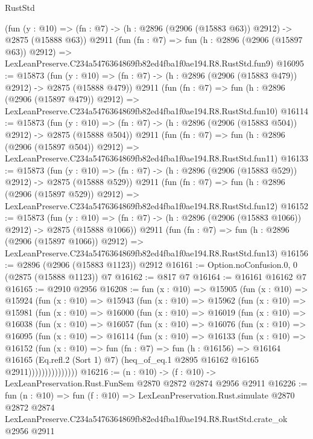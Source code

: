 \begin{lexlean}{RustStd}
\begin{coremodule}
    (fun (y : @10) => (fn : @7) -> (h : @2896 (@2906 (@15883 @63)) @2912) -> @2875 (@15888 @63))
    @2911
    (fun (fn : @7) =>
    fun (h : @2896 (@2906 (@15897 @63)) @2912) =>
    LexLeanPreserve.C234a5476364869fb82ed4fba1f0ae194.R8.RustStd.fun9)
@16095 := @15873
    (fun (y : @10) => (fn : @7) -> (h : @2896 (@2906 (@15883 @479)) @2912) -> @2875 (@15888 @479))
    @2911
    (fun (fn : @7) =>
    fun (h : @2896 (@2906 (@15897 @479)) @2912) =>
    LexLeanPreserve.C234a5476364869fb82ed4fba1f0ae194.R8.RustStd.fun10)
@16114 := @15873
    (fun (y : @10) => (fn : @7) -> (h : @2896 (@2906 (@15883 @504)) @2912) -> @2875 (@15888 @504))
    @2911
    (fun (fn : @7) =>
    fun (h : @2896 (@2906 (@15897 @504)) @2912) =>
    LexLeanPreserve.C234a5476364869fb82ed4fba1f0ae194.R8.RustStd.fun11)
@16133 := @15873
    (fun (y : @10) => (fn : @7) -> (h : @2896 (@2906 (@15883 @529)) @2912) -> @2875 (@15888 @529))
    @2911
    (fun (fn : @7) =>
    fun (h : @2896 (@2906 (@15897 @529)) @2912) =>
    LexLeanPreserve.C234a5476364869fb82ed4fba1f0ae194.R8.RustStd.fun12)
@16152 := @15873
    (fun (y : @10) => (fn : @7) -> (h : @2896 (@2906 (@15883 @1066)) @2912) -> @2875 (@15888 @1066))
    @2911
    (fun (fn : @7) =>
    fun (h : @2896 (@2906 (@15897 @1066)) @2912) =>
    LexLeanPreserve.C234a5476364869fb82ed4fba1f0ae194.R8.RustStd.fun13)
@16156 := @2896 (@2906 (@15883 @1123)) @2912
@16161 := Option.noConfusion.{0, 0} (@2875 (@15888 @1123)) @7
@16162 := @817 @7
@16164 := @16161 @16162 @7
@16165 := @2910 @2956
@16208 := fun (x : @10) =>
  @15905
    (fun (x : @10) =>
    @15924
      (fun (x : @10) =>
      @15943
        (fun (x : @10) =>
        @15962
          (fun (x : @10) =>
          @15981
            (fun (x : @10) =>
            @16000
              (fun (x : @10) =>
              @16019
                (fun (x : @10) =>
                @16038
                  (fun (x : @10) =>
                  @16057
                    (fun (x : @10) =>
                    @16076
                      (fun (x : @10) =>
                      @16095
                        (fun (x : @10) =>
                        @16114
                          (fun (x : @10) =>
                          @16133
                            (fun (x : @10) =>
                            @16152
                              (fun (x : @10) =>
                              fun (fn : @7) =>
                              fun (h : @16156) =>
                              @16164
                                @16165
                                (Eq.refl.{2} (Sort 1) @7)
                                (heq_of_eq.{1} @2895 @16162 @16165 @2911)))))))))))))))
@16216 := (n : @10) -> (f : @10) -> LexLeanPreservation.Rust.FunSem @2870 @2872 @2874 @2956 @2911
@16226 := fun (n : @10) =>
  fun (f : @10) =>
  LexLeanPreservation.Rust.simulate
    @2870
    @2872
    @2874
    LexLeanPreserve.C234a5476364869fb82ed4fba1f0ae194.R8.RustStd.crate_ok
    @2956
    @2911
\end{coremodule}
\end{lexlean}
